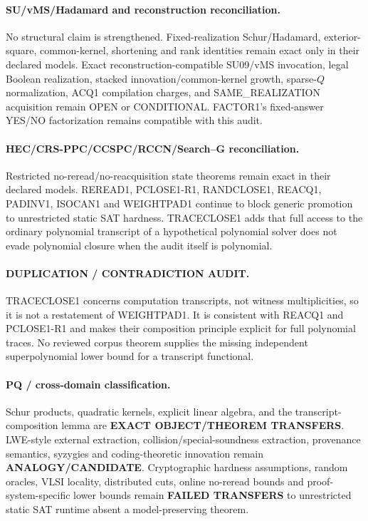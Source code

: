 \documentclass[11pt]{article}
\begin{document}
\paragraph{SU/vMS/Hadamard and reconstruction reconciliation.}
No structural claim is strengthened. Fixed-realization Schur/Hadamard, exterior-square, common-kernel, shortening and rank identities remain exact only in their declared models. Exact reconstruction-compatible SU09/vMS invocation, legal Boolean realization, stacked innovation/common-kernel growth, sparse-$Q$ normalization, ACQ1 compilation charges, and SAME\_REALIZATION acquisition remain OPEN or CONDITIONAL. FACTOR1's fixed-answer YES/NO factorization remains compatible with this audit.

\paragraph{HEC/CRS-PPC/CCSPC/RCCN/Search--G reconciliation.}
Restricted no-reread/no-reacquisition state theorems remain exact in their declared models. REREAD1, PCLOSE1-R1, RANDCLOSE1, REACQ1, PADINV1, ISOCAN1 and WEIGHTPAD1 continue to block generic promotion to unrestricted static SAT hardness. TRACECLOSE1 adds that full access to the ordinary polynomial transcript of a hypothetical polynomial solver does not evade polynomial closure when the audit itself is polynomial.

\paragraph{DUPLICATION / CONTRADICTION AUDIT.}
TRACECLOSE1 concerns computation transcripts, not witness multiplicities, so it is not a restatement of WEIGHTPAD1. It is consistent with REACQ1 and PCLOSE1-R1 and makes their composition principle explicit for full polynomial traces. No reviewed corpus theorem supplies the missing independent superpolynomial lower bound for a transcript functional.

\paragraph{PQ / cross-domain classification.}
Schur products, quadratic kernels, explicit linear algebra, and the transcript-composition lemma are \textbf{EXACT OBJECT/THEOREM TRANSFERS}. LWE-style external extraction, collision/special-soundness extraction, provenance semantics, syzygies and coding-theoretic innovation remain \textbf{ANALOGY/CANDIDATE}. Cryptographic hardness assumptions, random oracles, VLSI locality, distributed cuts, online no-reread bounds and proof-system-specific lower bounds remain \textbf{FAILED TRANSFERS} to unrestricted static SAT runtime absent a model-preserving theorem.
\end{document}
